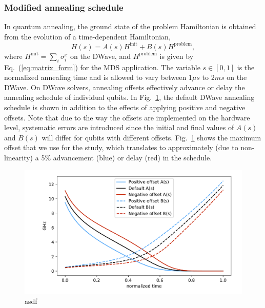 \documentclass[prd,twocolumn,tightenlines,preprintnumbers,showpacs,superscriptaddress,notitlepage,nofootinbib,eqsecnum,floatfix,longbibliography]{revtex4}
\begin{document}
\subsubsection{Modified annealing schedule}

In quantum annealing, the ground state of the problem Hamiltonian is obtained from the evolution of a time-dependent Hamiltonian,
\begin{equation}
H(s) = A(s) H^{\textrm{init}} + B(s) H^{\textrm{problem}}, \label{eq:tdhamiltonian}
\end{equation}
where $H^\textrm{init}=\sum_i\sigma^x_i$ on the DWave, and $H^\textrm{problem}$ is given by Eq.~(\ref{eq:matrix_form}) for the MDS application. The variable $s\in [0, 1]$ is the normalized annealing time and is allowed to vary between 1$\mu s$ to 2$ms$ on the DWave. On DWave solvers, annealing offsets effectively advance or delay the annealing schedule of individual qubits. In Fig.~\ref{fig:anneal_schedule}, the default DWave annealing schedule is shown in addition to the effects of applying positive and negative offsets. Note that due to the way the offsets are implemented on the hardware level, systematic errors are introduced since the initial and final values of $A(s)$ and $B(s)$ will differ for qubits with different offsets. Fig.~\ref{fig:anneal_schedule} shows the maximum offset that we use for the study, which translates to approximately (due to non-linearity) a 5\% advancement (blue) or delay (red) in the schedule.

\begin{figure}[b]
	\centering
	\includegraphics[width=\columnwidth]{./figures/anneal_schedule.pdf}
	\caption{asdf}
	\label{fig:anneal_schedule}
\end{figure}
\end{document}
